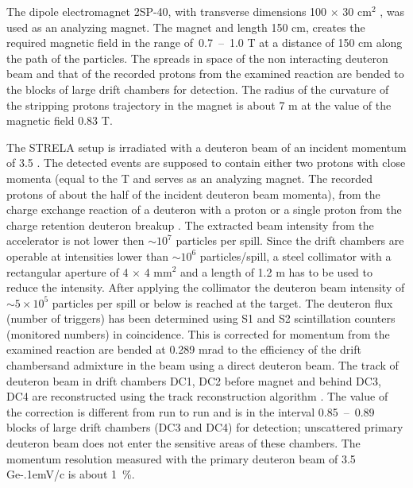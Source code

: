 \documentclass[twocolumn,epjc3]{svjour3}
\newcommand{\dpchex} {\ensuremath{dp \rightarrow (pp)n}\xspace}
\newcommand{\dpret}  {\ensuremath{dp \rightarrow (pn)p}\xspace}
\newcommand{\GeVc}   {Ge\kern-.1emV/c\xspace}
\providecommand{\DIFaddtex}[1]{{\protect\color{Green} \sf #1}} %
\providecommand{\DIFdeltex}[1]{{\protect\color{Red} \scriptsize #1}} %
\providecommand{\DIFaddbegin}{} %
\providecommand{\DIFaddend}{} %
\providecommand{\DIFdelbegin}{} %
\providecommand{\DIFdelend}{} %
\providecommand{\DIFadd}[1]{\texorpdfstring{\DIFaddtex{#1}}{#1}} %
\providecommand{\DIFdel}[1]{\texorpdfstring{\DIFdeltex{#1}}{}} %
\newcommand{\DIFscaledelfig}{0.5}
\newlength{\DIFdelgraphicswidth} %
\newlength{\DIFdelgraphicsheight} %
\newcommand{\DIFaddincludegraphics}[2][]{{\color{blue}\fbox{\DIFOincludegraphics[#1]{#2}}}} %
\newcommand{\DIFdelincludegraphics}[2][]{%
\sbox{\DIFdelgraphicsbox}{\DIFOincludegraphics[#1]{#2}}%
\settoboxwidth{\DIFdelgraphicswidth}{\DIFdelgraphicsbox} %
\settoboxtotalheight{\DIFdelgraphicsheight}{\DIFdelgraphicsbox} %
\scalebox{\DIFscaledelfig}{%
\parbox[b]{\DIFdelgraphicswidth}{\usebox{\DIFdelgraphicsbox}\\[-\baselineskip] \rule{\DIFdelgraphicswidth}{0em}}\llap{\resizebox{\DIFdelgraphicswidth}{\DIFdelgraphicsheight}{%
\setlength{\unitlength}{\DIFdelgraphicswidth}%
\begin{picture}(1,1)%
\thicklines\linethickness{2pt} %
{\color[rgb]{1,0,0}\put(0,0){\framebox(1,1){}}}%
{\color[rgb]{1,0,0}\put(0,0){\line( 1,1){1}}}%
{\color[rgb]{1,0,0}\put(0,1){\line(1,-1){1}}}%
\end{picture}%
}\hspace*{3pt}}} %
} %
\DeclareRobustCommand{\DIFaddbegin}{\DIFOaddbegin \let\includegraphics\DIFaddincludegraphics} %
\DeclareRobustCommand{\DIFaddend}{\DIFOaddend \let\includegraphics\DIFOincludegraphics} %
\DeclareRobustCommand{\DIFdelbegin}{\DIFOdelbegin \let\includegraphics\DIFdelincludegraphics} %
\DeclareRobustCommand{\DIFdelend}{\DIFOaddend \let\includegraphics\DIFOincludegraphics} %
\begin{document}
The dipole electromagnet 2SP-40, with transverse dimensions 100 $\times$ 30
cm$^2$ \DIFdelbegin \DIFdel{, was used as an analyzing magnet. The magnet }\DIFdelend \DIFaddbegin \DIFadd{and length 150 cm, }\DIFaddend creates the required magnetic field \DIFdelbegin \DIFdel{in the range of \,0.7~--~1.0 T at a distance of 150 cm along the
path of the particles. The spreads in space of the non interacting deuteron beam
and that of the recorded protons from the examined reaction are bended to the
blocks of large drift chambers for detection. The radius of the curvature of the
stripping protons trajectory in the magnet is about 7 m at the value of the
magnetic field 0.83 T.
}%

\DIFdel{The STRELA setup is irradiated with a deuteron beam of an incident momentum of
3.5 }%
\DIFdel{. The detected events are supposed to contain either two protons with
close momenta (equal to the }\DIFdelend \DIFaddbegin \DIFadd{0.85 T and serves
as an analyzing magnet. The recorded protons of about the }\DIFaddend half of the incident
deuteron beam \DIFdelbegin \DIFdel{momenta), from the charge exchange reaction of a deuteron with a proton }%
\DIFdel{or a single
proton from the charge retention deuteron breakup }%
\DIFdel{. The extracted beam
intensity from the accelerator is not lower then $\sim 10^{7}$ particles per
spill. Since the drift chambers are operable at intensities lower than
$\sim 10^{6}$ particles/spill, a steel collimator with a rectangular aperture of
4 $\times$ 4 mm$^2$ and a length of 1.2 m has to
be used to reduce the intensity. After applying the collimator the deuteron beam intensity of $\sim 5\times10^5$ particles per spill or below is reached at the target. The
deuteron flux (number of triggers) has been determined using S1 and S2
scintillation counters (monitored numbers) in coincidence. This is corrected for }\DIFdelend \DIFaddbegin \DIFadd{momentum from the examined reaction are bended at 0.289 mrad to
}\DIFaddend the \DIFdelbegin \DIFdel{efficiency of the drift chambersand admixture in the beam using a direct
deuteron beam. The
track of deuteron beam in drift chambers DC1, DC2 before
magnet and behind DC3, DC4 are reconstructed using the track reconstruction
algorithm \cite{gla13}. The value of the correction is
different from run to run
and is in the interval 0.85~--~0.89}\DIFdelend \DIFaddbegin \DIFadd{blocks of large drift chambers (DC3 and DC4) for detection; unscattered
primary deuteron beam does not enter the sensitive areas of these chambers}\DIFaddend . \DIFaddbegin \DIFadd{The
momentum resolution measured with the primary deuteron beam of 3.5 }\GeVc \DIFadd{is
about 1~\%.
}\DIFaddend 
\end{document}
